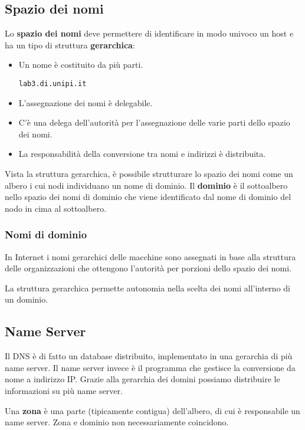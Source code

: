 \subsection{Spazio dei nomi}
Lo \textbf{spazio dei nomi} deve permettere di identificare in modo 
univoco un host e ha un tipo di struttura \textbf{gerarchica}:
\begin{itemize}
	\item Un nome è costituito da più parti.
	      \begin{center} \verb|lab3.di.unipi.it| \end{center}
	\item L'assegnazione dei nomi è delegabile.
	\item C'è una delega dell'autorità per l'assegnazione delle varie 
		parti dello spazio dei nomi.
	\item La responsabilità della conversione tra nomi e indirizzi è
		distribuita.
\end{itemize}
Vista la struttura gerarchica, è possibile strutturare lo spazio dei 
nomi come un albero i cui nodi individuano un nome di dominio. Il 
\textbf{dominio} è il sottoalbero nello spazio dei nomi di dominio che 
viene identificato dal nome di dominio del nodo in cima al sottoalbero.

\subsubsection{Nomi di dominio}
In Internet i nomi gerarchici delle macchine sono assegnati in base 
alla struttura delle organizzazioni che ottengono l'autorità per 
porzioni dello spazio dei nomi.

La struttura gerarchica permette autonomia nella scelta dei nomi 
all'interno di un dominio.

\subsection{Name Server}
Il DNS è di fatto un database distribuito, implementato in una 
gerarchia di più name server. Il name server invece è il programma che 
gestisce la conversione da nome a indirizzo IP. Grazie alla gerarchia 
dei domini possiamo distribuire le informazioni su più name server.

Una \textbf{zona} è una parte (tipicamente contigua) dell'albero, di 
cui è responsabile un name server. Zona e dominio non necessariamente 
coincidono.

